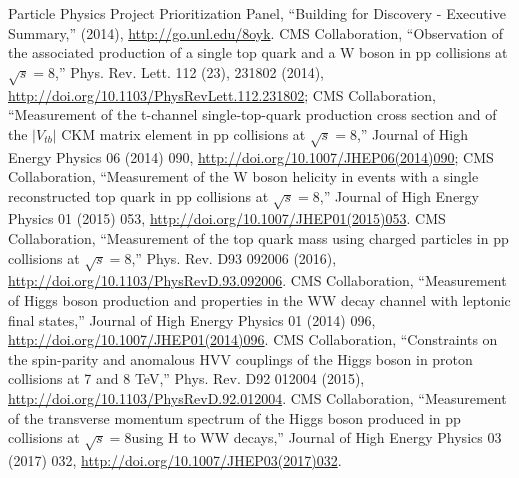 \begin{thebibliography}{99}





%
%

Particle Physics Project Prioritization Panel, ``Building for Discovery - Executive Summary,'' (2014), \url{http://go.unl.edu/8oyk}.
%
%
CMS Collaboration, ``Observation of the associated production of a single top quark and a W boson in pp collisions at $\sqrt{s}=$8\TeV,'' Phys. Rev. Lett. 112 (23), 231802 (2014), \url{http://doi.org/10.1103/PhysRevLett.112.231802};
%
CMS Collaboration, ``Measurement of the t-channel single-top-quark production cross section and of the $|V_{tb}|$ CKM matrix element in pp collisions at $\sqrt{s} = 8$\TeV,'' Journal of High Energy Physics 06 (2014) 090, \url{http://doi.org/10.1007/JHEP06(2014)090};
%
CMS Collaboration, ``Measurement of the W boson helicity in events with a
single reconstructed top quark in pp collisions at $\sqrt{s}=$8\TeV,''
Journal of High Energy Physics 01 (2015) 053,
\url{http://doi.org/10.1007/JHEP01(2015)053}.
%
 CMS Collaboration, ``Measurement of the top quark mass using charged
 particles in pp collisions at $\sqrt{s} = 8$\TeV,'' Phys. Rev.  D93 092006
 (2016), \url{http://doi.org/10.1103/PhysRevD.93.092006}. 
%
%
    CMS Collaboration, ``Measurement of Higgs boson production and properties in the WW decay channel with leptonic final states,''
    Journal of High Energy Physics 01 (2014) 096, \url{http://doi.org/10.1007/JHEP01(2014)096}.
%
  CMS Collaboration, ``Constraints on the spin-parity and anomalous HVV couplings of the Higgs boson in proton collisions at 7 and 8 TeV,''
  Phys. Rev. D92 012004 (2015), \url{http://doi.org/10.1103/PhysRevD.92.012004}.
%
    CMS Collaboration, ``Measurement of the transverse momentum spectrum of the Higgs boson produced in pp collisions at $\sqrt{s} = 8$\TeV using H to WW decays,'' Journal of High Energy Physics 03 (2017) 032, \url{http://doi.org/10.1007/JHEP03(2017)032}.

\end{thebibliography}
